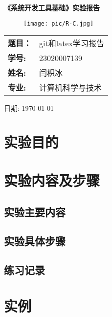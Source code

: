 \documentclass[a4paper]{article}
\begin{document}
 
\hypersetup{
colorlinks=true,
linkcolor=black
}
\begin{titlepage}  
    \centering  
    \huge \textbf{《系统开发工具基础》实验报告} \\  
    \vspace{5cm}  
    
     \begin{figure}[ht]
    \centering
    \texttt{[image: pic/R-C.jpg]}
\end{figure}
    \Large  
    \vspace{3cm} 
 
    \begin{tabular}{ll} 
        \textbf{题目：}&git和latex学习报告\\
        \cline{2-2} 
        \textbf{学号:} & 23020007139 \\ 
       \cline{2-2} 
        \textbf{姓名:} & 闫枳冰 \\  
        \cline{2-2} 
        \textbf{专业:} & 计算机科学与技术 \\  
       \cline{2-2} 
    \end{tabular}  
    \vspace{2cm}  
 
    \Large 日期: \today  
    
\end{titlepage}  

\tableofcontents
\newpage
{}
\section{实验目的}  

\section{实验内容及步骤}

\subsection{实验主要内容}
\subsection{实验具体步骤}
\subsection{练习记录}
\section{实例}
\end{document}
